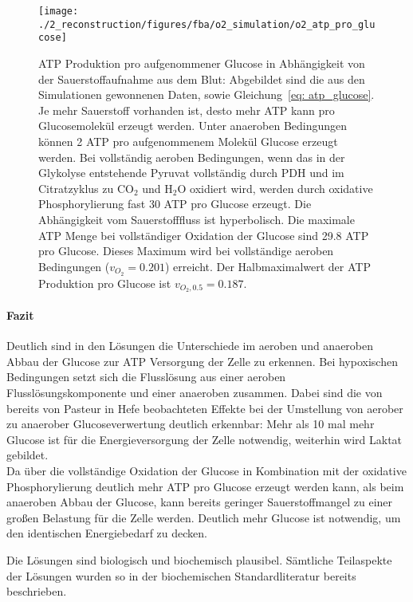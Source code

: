 \begin{figure}[!ht]
 \centering
 \texttt{[image: ./2\_reconstruction/figures/fba/o2\_simulation/o2\_atp\_pro\_glucose]}
\caption{ATP Produktion pro aufgenommener Glucose in Abhängigkeit von der Sauerstoffaufnahme aus dem Blut: Abgebildet sind die aus den Simulationen gewonnenen Daten, sowie Gleichung~\ref{eq: atp_glucose}.
Je mehr Sauerstoff vorhanden ist, desto mehr ATP kann pro Glucosemolekül erzeugt werden.
Unter anaeroben Bedingungen können 2 ATP pro aufgenommenem Molekül Glucose erzeugt werden. Bei vollständig aeroben Bedingungen, wenn das in der Glykolyse entstehende Pyruvat vollständig durch PDH und im Citratzyklus zu $\text{CO}_2$ und $\text{H}_2\text{O}$ oxidiert wird, werden durch oxidative Phosphorylierung fast 30 ATP pro Glucose erzeugt. Die Abhängigkeit vom Sauerstofffluss ist hyperbolisch. Die maximale ATP Menge bei vollständiger Oxidation der Glucose sind 29.8 ATP pro Glucose. 
Dieses Maximum wird bei vollständige aeroben Bedingungen ($v_{O_2}=0.201$) erreicht. Der Halbmaximalwert der ATP Produktion pro Glucose ist $v_{O_2, 0.5} = 0.187$.
}
\label{fig: o2_atp_pro_glucose}
\end{figure}

\paragraph{Fazit}
Deutlich sind in den Lösungen die Unterschiede im aeroben und anaeroben Abbau der Glucose zur ATP Versorgung der Zelle zu erkennen. Bei hypoxischen Bedingungen setzt sich die Flusslösung aus einer aeroben Flusslösungskomponente und einer anaeroben zusammen. Dabei sind die von bereits von Pasteur in Hefe beobachteten Effekte bei der Umstellung von aerober zu anaerober Glucoseverwertung deutlich erkennbar: Mehr als 10 mal mehr Glucose ist für die Energieversorgung der Zelle notwendig, weiterhin wird Laktat gebildet.\\
Da über die vollständige Oxidation der Glucose in Kombination mit der oxidative Phosphorylierung deutlich mehr ATP pro Glucose erzeugt werden kann, als beim anaeroben Abbau der Glucose, kann bereits geringer Sauerstoffmangel zu einer großen Belastung für die Zelle werden. Deutlich mehr Glucose ist notwendig, um den identischen Energiebedarf zu decken.

Die Lösungen sind biologisch und biochemisch plausibel. Sämtliche Teilaspekte der Lösungen wurden so in der biochemischen Standardliteratur bereits beschrieben. 


